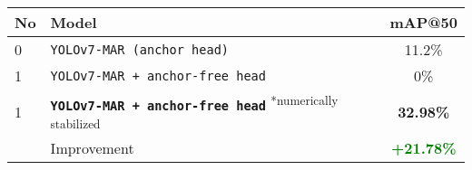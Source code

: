 \begin{tabular}{ l l c }
  \toprule[1.5pt]
  No & Model                                 &mAP@50 \\
  \midrule
  0  & \texttt{YOLOv7-MAR (anchor head)}        & 11.2\%\\
  1  & \texttt{YOLOv7-MAR + anchor-free head}       & 0\% \\
  1  & \textbf{\texttt{YOLOv7-MAR + anchor-free head}} \textsuperscript{*numerically stabilized}      & \textbf{32.98\%} \\
  \midrule
     & Improvement      & \textbf{\textcolor{green}{+21.78\%}} \\
  \bottomrule[1.5pt]
\end{tabular}